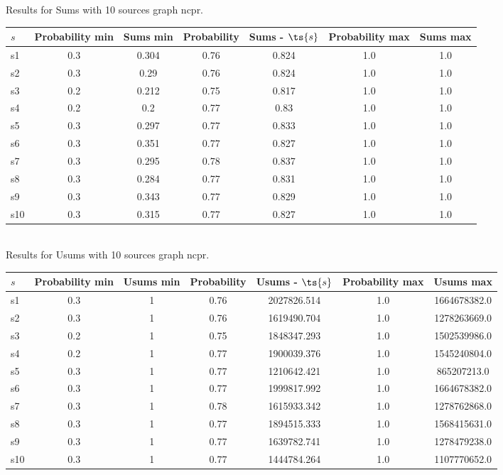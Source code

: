 \documentclass{article}
\begin{document}
\noindent Results for Sums with 10 sources graph ncpr.

\noindent\begin{tabular}{|l|c|c|c|c|c|c|}
\hline
$s$& Probability min & Sums min & Probability & Sums - $\ts{s}$ & Probability max & Sums max\\
\hline
s1 &0.3 & 0.304 & 0.76 & 0.824 & 1.0 & 1.0\\
\hline
s2 &0.3 & 0.29 & 0.76 & 0.824 & 1.0 & 1.0\\
\hline
s3 &0.2 & 0.212 & 0.75 & 0.817 & 1.0 & 1.0\\
\hline
s4 &0.2 & 0.2 & 0.77 & 0.83 & 1.0 & 1.0\\
\hline
s5 &0.3 & 0.297 & 0.77 & 0.833 & 1.0 & 1.0\\
\hline
s6 &0.3 & 0.351 & 0.77 & 0.827 & 1.0 & 1.0\\
\hline
s7 &0.3 & 0.295 & 0.78 & 0.837 & 1.0 & 1.0\\
\hline
s8 &0.3 & 0.284 & 0.77 & 0.831 & 1.0 & 1.0\\
\hline
s9 &0.3 & 0.343 & 0.77 & 0.829 & 1.0 & 1.0\\
\hline
s10 &0.3 & 0.315 & 0.77 & 0.827 & 1.0 & 1.0\\
\hline
\end{tabular}\\

\noindent Results for Usums with 10 sources graph ncpr.

\noindent\begin{tabular}{|l|c|c|c|c|c|c|}
\hline
$s$& Probability min & Usums min & Probability & Usums - $\ts{s}$ & Probability max & Usums max\\
\hline
s1 &0.3 & 1 & 0.76 & 2027826.514 & 1.0 & 1664678382.0\\
\hline
s2 &0.3 & 1 & 0.76 & 1619490.704 & 1.0 & 1278263669.0\\
\hline
s3 &0.2 & 1 & 0.75 & 1848347.293 & 1.0 & 1502539986.0\\
\hline
s4 &0.2 & 1 & 0.77 & 1900039.376 & 1.0 & 1545240804.0\\
\hline
s5 &0.3 & 1 & 0.77 & 1210642.421 & 1.0 & 865207213.0\\
\hline
s6 &0.3 & 1 & 0.77 & 1999817.992 & 1.0 & 1664678382.0\\
\hline
s7 &0.3 & 1 & 0.78 & 1615933.342 & 1.0 & 1278762868.0\\
\hline
s8 &0.3 & 1 & 0.77 & 1894515.333 & 1.0 & 1568415631.0\\
\hline
s9 &0.3 & 1 & 0.77 & 1639782.741 & 1.0 & 1278479238.0\\
\hline
s10 &0.3 & 1 & 0.77 & 1444784.264 & 1.0 & 1107770652.0\\
\hline
\end{tabular}\\
\end{document}

